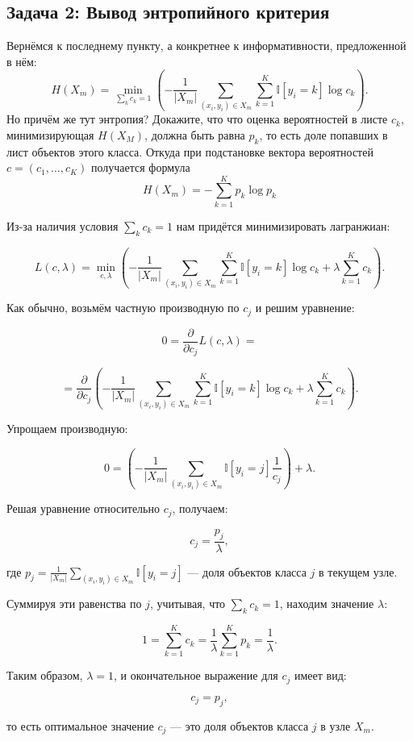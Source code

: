 \subsection{Задача 2: Вывод энтропийного критерия}
Вернёмся к последнему пункту, а конкретнее к информативности, предложенной в нём:
\[
    H(X_m) = \min_{\sum_k c_k = 1} \left( -\frac{1}{|X_m|} \sum_{(x_i, y_i) \in X_m} \sum_{k=1}^K \mathbb{I}[y_i = k] \log c_k \right).
\]
Но причём же тут энтропия? Докажите, что что оценка вероятностей в листе $c_{k}$, минимизирующая $H(X_M)$, должна быть равна $p_k$, то есть доле попавших в лист объектов этого класса. Откуда при подстановке вектора вероятностей $c = (c_1, \dots, c_K)$ получается формула
\[
    H(X_m) = - \sum_{k=1}^K p_k \log p_k
\]
\begin{solution}
    Из-за наличия условия $\sum_k c_k = 1$ нам придётся минимизировать лагранжиан:
    
    \[
        L(c, \lambda) = \min_{c, \lambda} \left( -\frac{1}{|X_m|} \sum_{(x_i, y_i) \in X_m} \sum_{k=1}^K \mathbb{I}[y_i = k] \log c_k + \lambda \sum_{k=1}^K c_k \right).
    \]
    
    Как обычно, возьмём частную производную по $c_j$ и решим уравнение:
    
    \[
        0 = \frac{\partial}{\partial c_j} L(c, \lambda) =
    \]
    
    \[
        = \frac{\partial}{\partial c_j} \left( -\frac{1}{|X_m|} \sum_{(x_i, y_i) \in X_m} \sum_{k=1}^K \mathbb{I}[y_i = k] \log c_k + \lambda \sum_{k=1}^K c_k \right).
    \]
    
    Упрощаем производную:
    
    \[
        0 = \left( -\frac{1}{|X_m|} \sum_{(x_i, y_i) \in X_m} \mathbb{I}[y_i = j] \frac{1}{c_j} \right) + \lambda.
    \]
    
    Решая уравнение относительно $c_j$, получаем:
    
    \[
        c_j = \frac{p_j}{\lambda},
    \]
    
    где $p_j = \frac{1}{|X_m|} \sum_{(x_i, y_i) \in X_m} \mathbb{I}[y_i = j]$ — доля объектов класса $j$ в текущем узле.
    
    Суммируя эти равенства по $j$, учитывая, что $\sum_k c_k = 1$, находим значение $\lambda$:
    
    \[
        1 = \sum_{k=1}^K c_k = \frac{1}{\lambda} \sum_{k=1}^K p_k = \frac{1}{\lambda}.
    \]
    
    Таким образом, $\lambda = 1$, и окончательное выражение для $c_j$ имеет вид:
    
    \[
        c_j = p_j,
    \]
    
    то есть оптимальное значение $c_j$ — это доля объектов класса $j$ в узле $X_m$.
\end{solution}

